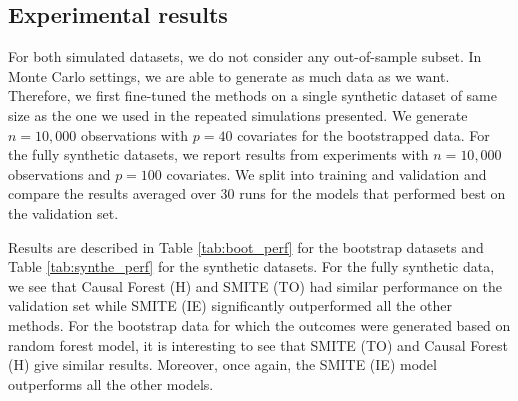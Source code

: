 \subsection{Experimental results}

For both simulated datasets, we do not consider any out-of-sample subset. In Monte Carlo settings, we are able to generate as much data as we want. Therefore, we first fine-tuned the methods on a single synthetic dataset of same size as the one we used in the repeated simulations presented. We generate $n=10,000$ observations with $p=40$ covariates for the bootstrapped data. For the fully synthetic datasets, we report results from experiments with $n=10,000$ observations and $p=100$ covariates. We split into training and validation and compare the results averaged over $30$ runs for the models that performed best on the validation set. 

Results are described in Table \ref{tab:boot_perf} for the bootstrap datasets and Table \ref{tab:synthe_perf} for the synthetic datasets. For the fully synthetic data, we see that Causal Forest (H) and SMITE (TO) had similar performance on the validation set while SMITE (IE) significantly outperformed all the other methods. For the bootstrap data for which the outcomes were generated based on random forest model, it is interesting to see that SMITE (TO) and Causal Forest (H) give similar results. Moreover, once again, the SMITE (IE) model outperforms all the other models.






